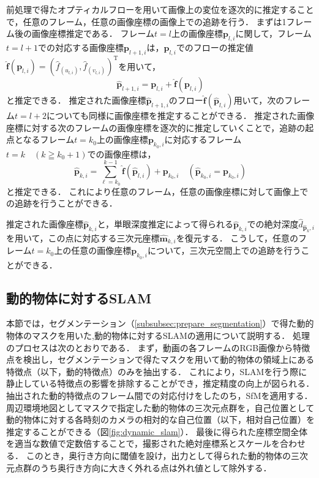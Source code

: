 前処理で得たオプティカルフローを用いて画像上の変位を逐次的に推定することで，任意のフレーム，任意の画像座標の画像上での追跡を行う．
まずは1フレーム後の画像座標推定である．
フレーム$t=l$上の画像座標$\mathbf{p}_{l,i}$に関して，フレーム$t=l+1$での対応する画像座標$\mathbf{p}_{l+1,i}$は，$\mathbf{p}_{l,i}$でのフローの推定値$\hat{\mathbf{f}}(\mathbf{p}_{l,i})=(\hat{f}_{(u_{l,i})},\hat{f}_{(v_{l,i})})^\mathrm{T}$を用いて，
\begin{equation}\label{eq:flow_estimation}
	\hat{\mathbf{p}}_{l+1,i} = \mathbf{p}_{l,i} + \hat{\mathbf{f}}(\mathbf{p}_{l,i})
\end{equation}
と推定できる．
推定された画像座標$\hat{\mathbf{p}}_{l+1,i}$のフロー$\hat{\mathbf{f}}(\hat{\mathbf{p}}_{l,i})$用いて，次のフレーム$t=l+2$についても同様に画像座標を推定することができる．
推定された画像座標に対する次のフレームの画像座標を逐次的に推定していくことで，追跡の起点となるフレーム$t=k_0$上の画像座標$\mathbf{p}_{k_0,i}$に対応するフレーム$t=k \quad(k\geqq k_0+1)$での画像座標は，
\begin{equation}\label{eq:tracking}
	\hat{\mathbf{p}}_{k, i}=\sum_{\ell=k_0}^{k-1} \hat{\mathbf{f}}\left(\hat{\mathbf{p}}_{l, i}\right)+\mathbf{p}_{k_0, i} \quad\left(\hat{\mathbf{p}}_{k_0, i}=\mathbf{p}_{
		k_0, i}\right)
\end{equation}
と推定できる．
これにより任意のフレーム，任意の画像座標に対して画像上での追跡を行うことができる．

推定された画像座標$\hat{\mathbf{p}}_{k, i}$と，単眼深度推定によって得られる$\hat{\mathbf{p}}_{k, i}$での絶対深度$\hat{d}_{\mathbf{\hat{p}}_k,i}$を用いて，この点に対応する三次元座標$\hat{\mathbf{m}}_{k, i}$を復元する．
こうして，任意のフレーム$t=k_0$上の任意の画像座標$\mathbf{p}_{k_0,i}$について，三次元空間上での追跡を行うことができる．


\subsection{動的物体に対するSLAM}\label{subsec:SLAM_foreground}
本節では，セグメンテーション（\ref{subsubsec:prepare_segmentation}）で得た動的物体のマスクを用いた,動的物体に対するSLAMの適用について説明する．
処理のプロセスは次のとおりである．
まず，動画の各フレームのRGB画像から特徴点を検出し，セグメンテーションで得たマスクを用いて動的物体の領域上にある特徴点（以下，動的特徴点）のみを抽出する．
これにより，SLAMを行う際に静止している特徴点の影響を排除することができ，推定精度の向上が図られる．
抽出された動的特徴点のフレーム間での対応付けをしたのち，SfMを適用する．
周辺環境地図としてマスクで指定した動的物体の三次元点群を，自己位置として動的物体に対する各時刻のカメラの相対的な自己位置（以下，相対自己位置）を推定することができる（図\ref{fig:dynamic_slam}）．
最後に得られた座標空間全体を適当な数値で定数倍することで，撮影された絶対座標系とスケールを合わせる．
このとき，奥行き方向に閾値を設け，出力として得られた動的物体の三次元点群のうち奥行き方向に大きく外れる点は外れ値として除外する．

